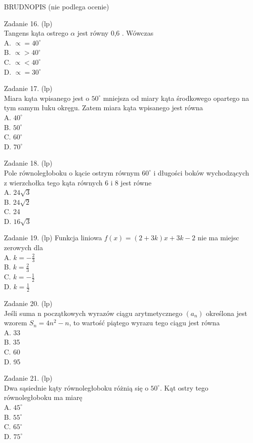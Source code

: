 \documentclass[10pt]{article}
\begin{document}
BRUDNOPIS (nie podlega ocenie)

Zadanie 16. (lp)\\
Tangens kąta ostrego \(\alpha\) jest równy 0,6 . Wówczas\\
A. \(\propto=40^{\circ}\)\\
B. \(\propto>40^{\circ}\)\\
C. \(\propto<40^{\circ}\)\\
D. \(\propto=30^{\circ}\)

Zadanie 17. (lp)\\
Miara kąta wpisanego jest o \(50^{\circ}\) mniejsza od miary kąta środkowego opartego na tym samym łuku okręgu. Zatem miara kąta wpisanego jest równa\\
A. \(40^{\circ}\)\\
B. \(50^{\circ}\)\\
C. \(60^{\circ}\)\\
D. \(70^{\circ}\)

Zadanie 18. (lp)\\
Pole równoległoboku o kącie ostrym równym \(60^{\circ}\) i długości boków wychodzących z wierzchołka tego kąta równych 6 i 8 jest równe\\
A. \(24 \sqrt{3}\)\\
B. \(24 \sqrt{2}\)\\
C. 24\\
D. \(16 \sqrt{3}\)

Zadanie 19. (lp) Funkcja liniowa \(f(x)=(2+3 k) x+3 k-2\) nie ma miejsc zerowych dla\\
A. \(k=-\frac{2}{3}\)\\
B. \(k=\frac{2}{3}\)\\
C. \(k=-\frac{1}{2}\)\\
D. \(k=\frac{1}{2}\)

Zadanie 20. (lp)\\
Jeśli suma n początkowych wyrazów ciągu arytmetycznego \(\left(a_{n}\right)\) określona jest wzorem \(S_{n}=4 n^{2}-n\), to wartość piątego wyrazu tego ciągu jest równa\\
A. 33\\
B. 35\\
C. 60\\
D. 95

Zadanie 21. (lp)\\
Dwa sąsiednie kąty równoległoboku różnią się o \(50^{\circ}\). Kąt ostry tego równoległoboku ma miarę\\
A. \(45^{\circ}\)\\
B. \(55^{\circ}\)\\
C. \(65^{\circ}\)\\
D. \(75^{\circ}\)
\end{document}
